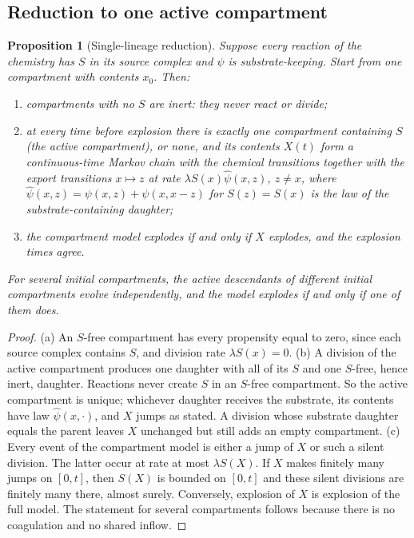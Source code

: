 \documentclass[11pt,a4paper]{article}
\numberwithin{equation}{section}
\newtheorem{proposition}[theorem]{Proposition}
\theoremstyle{definition}\newtheorem{definition}[theorem]{Definition}
\theoremstyle{remark}\newtheorem{remark}[theorem]{Remark}\newtheorem{example}[theorem]{Example}
\begin{document}
\subsection{Reduction to one active compartment}
\begin{proposition}[Single-lineage reduction]\label{prop:reduction}
Suppose every reaction of the chemistry has $S$ in its source complex and $\psi$ is substrate-keeping. Start from one compartment with contents $x_0$. Then:
\begin{enumerate}[label=(\alph*)]
\item compartments with no $S$ are inert: they never react or divide;
\item at every time before explosion there is exactly one compartment containing $S$ (the \emph{active} compartment), or none, and its contents $X(t)$ form a continuous-time Markov chain with the chemical transitions together with the \emph{export} transitions $x\mapsto z$ at rate $\lambda S(x)\widehat\psi(x,z)$, $z\ne x$, where $\widehat\psi(x,z)=\psi(x,z)+\psi(x,x-z)$ for $S(z)=S(x)$ is the law of the substrate-containing daughter;
\item the compartment model explodes if and only if $X$ explodes, and the explosion times agree.
\end{enumerate}
For several initial compartments, the active descendants of different initial compartments evolve independently, and the model explodes if and only if one of them does.
\end{proposition}

\begin{proof}
(a) An $S$-free compartment has every propensity equal to zero, since each source complex contains $S$, and division rate $\lambda S(x)=0$. (b) A division of the active compartment produces one daughter with all of its $S$ and one $S$-free, hence inert, daughter. Reactions never create $S$ in an $S$-free compartment. So the active compartment is unique; whichever daughter receives the substrate, its contents have law $\widehat\psi(x,\cdot)$, and $X$ jumps as stated. A division whose substrate daughter equals the parent leaves $X$ unchanged but still adds an empty compartment. (c) Every event of the compartment model is either a jump of $X$ or such a silent division. The latter occur at rate at most $\lambda S(X)$. If $X$ makes finitely many jumps on $[0,t]$, then $S(X)$ is bounded on $[0,t]$ and these silent divisions are finitely many there, almost surely. Conversely, explosion of $X$ is explosion of the full model. The statement for several compartments follows because there is no coagulation and no shared inflow.
\end{proof}
\end{document}
